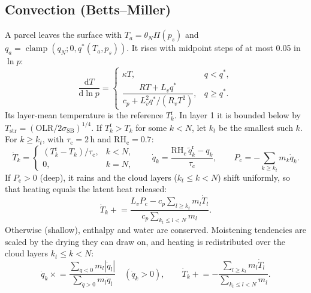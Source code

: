 \documentclass[11pt,a4paper]{article}
\newcommand{\dd}{\mathrm{d}}
\newcommand{\dv}[2]{\frac{\dd #1}{\dd #2}}
\newcommand{\clamp}{\operatorname{clamp}}
\begin{document}
\subsection{Convection (Betts--Miller)}
A parcel leaves the surface with $T_a = \theta_N\Pi(p_s)$ and
$q_a = \clamp(q_N; 0, q^*(T_a,p_s))$. It rises with midpoint steps of at most 0.05
in $\ln p$:
\begin{equation}
\dv{T}{\ln p} = \begin{cases}
\kappa T, & q < q^*,\\[1ex]
\dfrac{RT + L_v q^*}{c_p + L_v^2 q^*/(R_v T^2)}, & q \ge q^* .
\end{cases}
\end{equation}
Its layer-mean temperature is the reference $T^{\mathrm{r}}_k$. In layer 1 it is
bounded below by $T_{\mathrm{str}} = (\mathrm{OLR}/2\sigma_{\mathrm{SB}})^{1/4}$. If
$T^{\mathrm{r}}_k > T_k$ for some $k < N$, let $k_t$ be the smallest such $k$. For
$k \ge k_t$, with $\tau_{\mathrm{c}} = 2$\,h and $\mathrm{RH}_{\mathrm{c}} = 0.7$:
\begin{equation}
\dot T_k = \begin{cases}(T^{\mathrm{r}}_k - T_k)/\tau_{\mathrm{c}}, & k < N,\\ 0, & k = N,\end{cases}
\qquad
\dot q_k = \frac{\mathrm{RH}_{\mathrm{c}}\,\tilde q^{\mathrm{r}}_k - q_k}{\tau_{\mathrm{c}}},
\qquad
P_{\mathrm{c}} = -\sum_{k\ge k_t} m_k\dot q_k .
\end{equation}
If $P_{\mathrm{c}} > 0$ (deep), it rains and the cloud layers ($k_t \le k < N$) shift
uniformly, so that heating equals the latent heat released:
\begin{equation}
\dot T_k \mathrel{+}= \frac{L_v P_{\mathrm{c}} - c_p\sum_{l\ge k_t} m_l\dot T_l}
   {c_p\sum_{k_t\le l<N} m_l}.
\end{equation}
Otherwise (shallow), enthalpy and water are conserved. Moistening tendencies are
scaled by the drying they can draw on, and heating is redistributed over the
cloud layers $k_t \le k < N$:
\begin{equation}
\dot q_k \mathrel{\times}= \frac{\sum_{\dot q<0}m_l|\dot q_l|}{\sum_{\dot q>0}m_l\dot q_l}
   \quad(\dot q_k > 0), \qquad
\dot T_k \mathrel{+}= -\frac{\sum_{l\ge k_t}m_l\dot T_l}{\sum_{k_t\le l<N}m_l}.
\end{equation}
\end{document}
